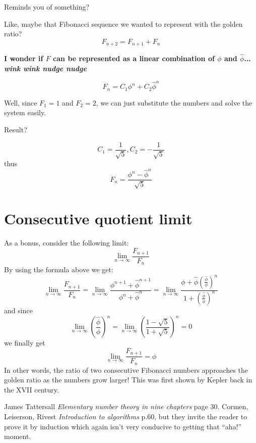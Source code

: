 \documentclass{article}
\begin{document}
Reminds you of something?

Like, maybe that Fibonacci sequence we wanted to represent with the golden ratio? $$F_{n+2} = F_{n+1} + F_{n}$$

\textbf{I wonder if $F$ can be represented as a linear combination of $\phi$ and $\hat{\phi}$... \textit{wink wink nudge nudge}}

$$F_n = C_1 \phi^n + C_2 \hat\phi^n$$

Well, since $F_1 = 1$ and $F_2 = 2$, we can just substitute the numbers and solve the system easily.

Result?

$$C_1 = \frac{1}{\sqrt{5}}, C_2 = -\frac{1}{\sqrt{5}}$$
thus
\begin{equation}
  F_n = \frac {\phi^n - \hat{\phi}^n}{\sqrt{5}}
\end{equation}

\section{Consecutive quotient limit}
As a bonus, consider the following limit:
$$\lim_{n\to\infty} \frac{F_{n+1}}{F_{n}}$$
By using the formula above we get:
$$\lim_{n\to\infty} \frac{F_{n+1}}{F_{n}} = \lim_{n\to\infty} \frac{\phi^{n+1} + \hat\phi^{n+1}}{\phi^{n} + \hat\phi^{n}} = \lim_{n\to\infty} \frac{\phi + \hat\phi (\frac{\hat\phi}{\phi})^n}{1 + (\frac{\hat\phi}{\phi})^n}$$
and since $$\lim_{n\to\infty}(\frac{\hat\phi}{\phi})^n = \lim_{n\to\infty}(\frac{1-\sqrt{5}}{1+\sqrt{5}})^n = 0 $$
we finally get
\begin{equation}
  \lim_{n\to\infty}\frac{F_{n+1}}{F_n} = \phi
\end{equation}
In other words, the ratio of two consecutive Fibonacci numbers approaches the golden ratio as the numbers grow larger!
This was first shown by Kepler back in the XVII century.

\begin{thebibliography}{1}

 James Tattersall {\em Elementary number theory in nine chapters} page 30.
 Cormen, Leiserson, Rivest {\em Introduction to algorithms} p.60, but they invite the reader to prove it by induction which again isn't very conducive to getting that ``aha!'' moment.

\end{thebibliography}
\end{document}
